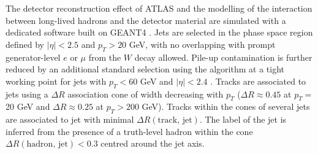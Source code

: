 The detector reconstruction effect of ATLAS and the modelling of the interaction between long-lived hadrons and the detector material are simulated with a dedicated software \cite{ATLASSimulationInfra} built on GEANT4 \cite{Agostinelli:602040}. Jets are selected in the phase space region defined by $|\eta| < 2.5$ and $p_T > 20$ GeV, with no overlapping with prompt generator-level $e$ or $\mu$ from the $W$ decay allowed. Pile-up contamination is further reduced by an additional standard selection using the  algorithm at a tight working point for jets with $p_T < 60$ GeV and $|\eta| < 2.4$ \cite{ATLAS-CONF-2014-018}. Tracks are associated to jets using a $\Delta R$ association cone of width decreasing with $p_T$ ($\Delta R \approx 0.45$ at $p_T =$ 20 GeV and $\Delta R \approx 0.25$ at $p_T > 200$ GeV). Tracks within the cones of several jets are associated to jet with minimal $\Delta R(\textrm{track, jet})$. The label of the jet is inferred from the presence of a truth-level hadron within the cone $\Delta R(\textrm{hadron, jet}) < 0.3$ centred around the jet axis.

